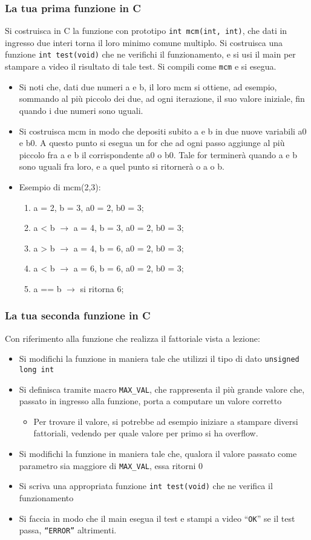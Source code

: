 \documentclass{beamer}
\begin{document}
\begin{frame}
\frametitle{La tua prima funzione in C}
Si costruisca in C la funzione con prototipo \texttt{int mcm(int, int)}, che dati in ingresso due interi torna il loro minimo comune multiplo. Si costruisca una funzione \texttt{int test(void)} che ne verifichi il funzionamento, e si usi il main per stampare a video il risultato di tale test. Si compili come \texttt{mcm} e si esegua.
 \begin{itemize}
  \item Si noti che, dati due numeri a e b, il loro mcm si ottiene, ad esempio, sommando al più piccolo dei due, ad ogni iterazione, il suo valore iniziale, fin quando i due numeri sono uguali.
  \item Si costruisca mcm in modo che depositi subito a e b in due nuove variabili a0 e b0. A questo punto si esegua un for che ad ogni passo aggiunge al più piccolo fra a e b il corrispondente a0 o b0. Tale for terminerà quando a e b sono uguali fra loro, e a quel punto si ritornerà o a o b.
  \item Esempio di mcm(2,3):
  \begin{enumerate}
  \scriptsize
   \item a = 2, b = 3, a0 = 2, b0 = 3;
   \item a < b $\rightarrow{}$ a = 4, b = 3, a0 = 2, b0 = 3;
   \item a > b $\rightarrow{}$ a = 4, b = 6, a0 = 2, b0 = 3;
   \item a < b $\rightarrow{}$ a = 6, b = 6, a0 = 2, b0 = 3;
   \item a == b $\rightarrow{}$ si ritorna 6;
  \end{enumerate}
 \end{itemize}
\end{frame}

\begin{frame}
\frametitle{La tua seconda funzione in C}
Con riferimento alla funzione che realizza il fattoriale vista a lezione:
\begin{itemize}
 \item Si modifichi la funzione in maniera tale che utilizzi il tipo di dato \texttt{unsigned long int}
 \item Si definisca tramite macro \texttt{MAX\_VAL}, che rappresenta il più grande valore che, passato in ingresso alla funzione, porta a computare un valore corretto
  \begin{itemize}
    \item Per trovare il valore, si potrebbe ad esempio iniziare a stampare diversi fattoriali, vedendo per quale valore per primo si ha overflow.
  \end{itemize}
 \item Si modifichi la funzione in maniera tale che, qualora il valore passato come parametro sia maggiore di \texttt{MAX\_VAL}, essa ritorni 0
 \item Si scriva una appropriata funzione \texttt{int test(void)} che ne verifica il funzionamento
 \item Si faccia in modo che il main esegua il test e stampi a video ``\texttt{OK}'' se il test passa, \texttt{``ERROR''} altrimenti.
\end{itemize}
\end{frame}
\end{document}
